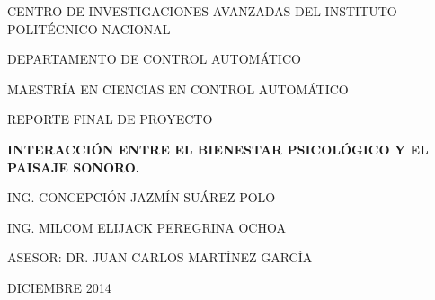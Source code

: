 % 

\begin{center}
CENTRO DE INVESTIGACIONES AVANZADAS DEL INSTITUTO POLIT\'{E}CNICO NACIONAL

DEPARTAMENTO DE CONTROL AUTOM\'{A}TICO

MAESTR\'{I}A EN CIENCIAS EN CONTROL AUTOM\'{A}TICO

REPORTE FINAL DE PROYECTO

\textbf{INTERACCI\'{O}N ENTRE EL BIENESTAR PSICOL\'{O}GICO Y EL PAISAJE
SONORO.}

ING. CONCEPCI\'{O}N JAZM\'{I}N SU\'{A}REZ POLO

ING. MILCOM ELIJACK PEREGRINA OCHOA

ASESOR: DR. JUAN CARLOS MART\'{I}NEZ GARC\'{I}A

\bigskip

DICIEMBRE 2014

\bigskip
\end{center}

